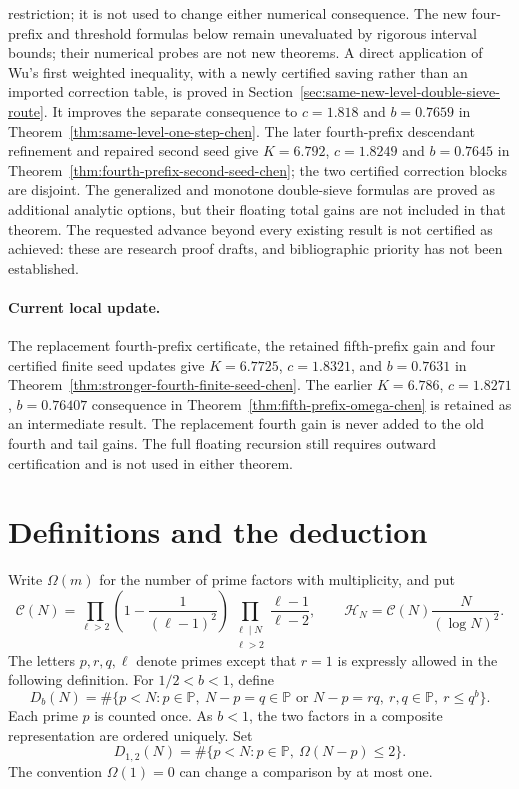 \documentclass[11pt]{article}
\newcommand{\PP}{\mathbb P}
\newcommand{\CN}{\mathcal C(N)}
\newcommand{\HN}{\mathcal H_N}
\begin{document}
restriction; it is not used to change either numerical consequence.
The new four-prefix and threshold formulas below remain unevaluated
by rigorous interval bounds; their numerical probes are not new
theorems. A direct application of Wu's first weighted inequality,
with a newly certified saving rather than an imported correction table,
is proved in Section~\ref{sec:same-new-level-double-sieve-route}.
It improves the separate consequence to $c=1.818$ and $b=0.7659$ in
Theorem~\ref{thm:same-level-one-step-chen}. The later fourth-prefix
descendant refinement and repaired second seed give $K=6.792$,
$c=1.8249$ and $b=0.7645$ in
Theorem~\ref{thm:fourth-prefix-second-seed-chen}; the two certified
correction blocks are disjoint. The generalized and monotone
double-sieve formulas are proved as additional analytic options,
but their floating total gains are not included in that theorem.
The requested advance beyond every existing result is not certified as achieved: these
are research proof drafts, and bibliographic priority has not been
established.

\paragraph{Current local update.}
The replacement fourth-prefix certificate, the retained fifth-prefix
gain and four certified finite seed updates give $K=6.7725$,
$c=1.8321$, and $b=0.7631$ in
Theorem~\ref{thm:stronger-fourth-finite-seed-chen}.
The earlier $K=6.786$, $c=1.8271$, $b=0.76407$ consequence in
Theorem~\ref{thm:fifth-prefix-omega-chen} is retained as an intermediate
result. The replacement fourth gain is never added to the old fourth
and tail gains. The full floating recursion still requires outward
certification and is not used in either theorem.

\section{Definitions and the deduction}
Write $\Omega(m)$ for the number of prime factors with multiplicity, and put
\[
 \CN=\prod_{\ell>2}\left(1-\frac1{(\ell-1)^2}\right)
       \prod_{\substack{\ell\mid N\\\ell>2}}\frac{\ell-1}{\ell-2},
 \qquad \HN=\CN\frac{N}{(\log N)^2}.
\]
The letters $p,r,q,\ell$ denote primes except that $r=1$ is expressly
allowed in the following definition. For $1/2<b<1$, define
\[
 D_b(N)=\#\{p<N:p\in\PP,\ N-p=q\in\PP\text{ or }
             N-p=rq,\ r,q\in\PP,\ r\le q^b\}.
\]
Each prime $p$ is counted once. As $b<1$, the two factors in a composite
representation are ordered uniquely. Set
\[
 D_{1,2}(N)=\#\{p<N:p\in\PP,\ \Omega(N-p)\le2\}.
\]
The convention $\Omega(1)=0$ can change a comparison by at most one.
\end{document}

